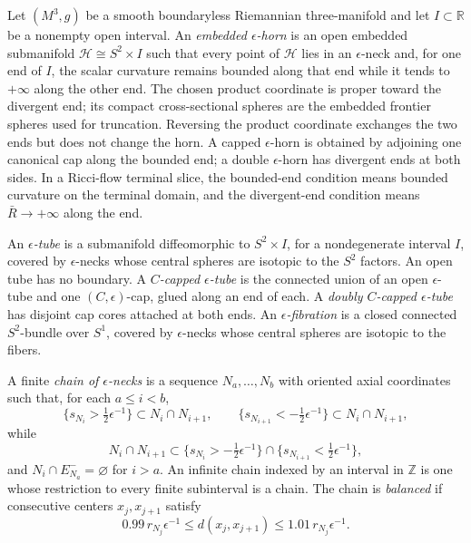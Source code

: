 \begin{definition}
\label{def:epsilon-horn-terminology}
\notready
Let $(M^3,g)$ be a smooth boundaryless Riemannian three-manifold and let
$I\subset\mathbb R$ be a nonempty open interval.  An \emph{embedded
$\epsilon$-horn} is an open embedded submanifold
$\mathcal H\cong S^2\times I$ such that every point of $\mathcal H$ lies in
an $\epsilon$-neck and, for one end of $I$, the scalar curvature remains
bounded along that end while it tends to $+\infty$ along the other end.  The
chosen product coordinate is proper toward the divergent end; its compact
cross-sectional spheres are the embedded frontier spheres used for truncation.
Reversing the product coordinate exchanges the two ends but does not change
the horn.  A capped $\epsilon$-horn is obtained by adjoining one canonical cap
along the bounded end; a double $\epsilon$-horn has divergent ends at both
sides.  In a Ricci-flow terminal slice, the bounded-end condition means
bounded curvature on the terminal domain, and the divergent-end condition means
$\bar R\to+\infty$ along the end.
\end{definition}

\begin{definition}
\label{def:canonical-neck-cap-regions}
\notready
An \emph{$\epsilon$-tube} is a submanifold diffeomorphic to
$S^2\times I$, for a nondegenerate interval $I$, covered by
$\epsilon$-necks whose central spheres are isotopic to the $S^2$ factors.
An open tube has no boundary.  A \emph{$C$-capped $\epsilon$-tube} is the
connected union of an open $\epsilon$-tube and one $(C,\epsilon)$-cap,
glued along an end of each.  A \emph{doubly $C$-capped
$\epsilon$-tube} has disjoint cap cores attached at both ends.  An
\emph{$\epsilon$-fibration} is a closed connected $S^2$-bundle over
$S^1$, covered by $\epsilon$-necks whose central spheres are isotopic to
the fibers.
\end{definition}

\begin{definition}
\label{def:balanced-neck-chain}
\notready
A finite \emph{chain of $\epsilon$-necks} is a sequence
$N_a,\ldots,N_b$ with oriented axial coordinates such that, for each
$a\le i<b$,
\[
 \{s_{N_i}>\tfrac12\epsilon^{-1}\}\subset N_i\cap N_{i+1},
 \qquad
 \{s_{N_{i+1}}<-\tfrac12\epsilon^{-1}\}\subset N_i\cap N_{i+1},
\]
while
\[
 N_i\cap N_{i+1}\subset
 \{s_{N_i}>-\tfrac12\epsilon^{-1}\}
 \cap\{s_{N_{i+1}}<\tfrac12\epsilon^{-1}\},
\]
and $N_i\cap E_{N_a}^-=\varnothing$ for
$i>a$.  An infinite chain indexed by an interval in $\mathbb Z$ is one
whose restriction to every finite subinterval is a chain.  The chain is
\emph{balanced} if consecutive centers $x_j,x_{j+1}$ satisfy
\[
 0.99\,r_{N_j}\epsilon^{-1}
 \le d(x_j,x_{j+1})
 \le1.01\,r_{N_j}\epsilon^{-1}.
\]
\end{definition}

